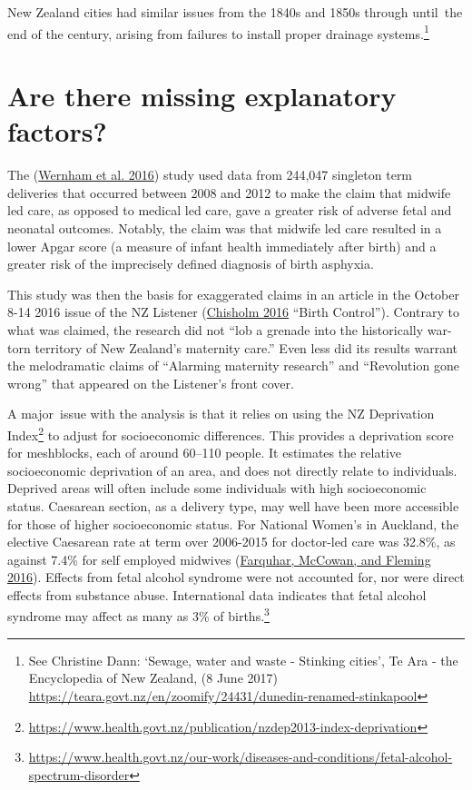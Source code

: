 \documentclass[
  10ptls,
  b5paper]{book}
\begin{document}
New Zealand cities had similar issues from the 1840s and 1850s through until~the end of the century, arising from failures to install proper drainage systems.\footnote{See Christine Dann: `Sewage, water and waste - Stinking cities', Te Ara - the Encyclopedia of New Zealand, (8 June 2017) \url{https://teara.govt.nz/en/zoomify/24431/dunedin-renamed-stinkapool}}

\hypertarget{sec:maternity}{%
\section{Are there missing explanatory factors?}\label{sec:maternity}}

The (\protect\hyperlink{ref-wernham_EtAl_2016}{Wernham et al. 2016}) study used data from 244,047 singleton term deliveries that occurred between 2008 and 2012 to make the claim that midwife led care, as opposed to medical led care, gave a greater risk of adverse fetal and neonatal outcomes. Notably, the claim was that midwife led care resulted in a lower Apgar score (a measure of infant health immediately after birth) and a greater risk of the imprecisely defined diagnosis of birth asphyxia.

This study was then the basis for exaggerated claims in an article in the October 8-14 2016 issue of the NZ Listener (\protect\hyperlink{ref-chisholm_2016}{Chisholm 2016} ``Birth Control''). Contrary to what was claimed, the research did not ``lob a grenade into the historically war-torn territory of New Zealand's maternity care.'' Even less did its results warrant the melodramatic claims of ``Alarming maternity research'' and ``Revolution gone wrong'' that appeared on the Listener's front cover.

A major~issue with the analysis is that it relies on using the NZ Deprivation Index\footnote{\url{https://www.health.govt.nz/publication/nzdep2013-index-deprivation}} to adjust for socioeconomic differences. This provides a deprivation score for meshblocks, each of around 60--110 people. It estimates the relative socioeconomic deprivation of an area, and does not directly relate to individuals. Deprived areas will often include some individuals with high socioeconomic status. Caesarean section, as a delivery type, may well have been more accessible for those of higher socioeconomic status. For National Women's in Auckland, the elective Caesarean rate at term over 2006-2015 for doctor-led care was 32.8\%, as against 7.4\% for self employed midwives (\protect\hyperlink{ref-farquhar2016letter}{Farquhar, McCowan, and Fleming 2016}). Effects from fetal alcohol syndrome were not accounted for, nor were direct effects from substance abuse. International data indicates that fetal alcohol syndrome may affect as many as 3\% of births.\footnote{\url{https://www.health.govt.nz/our-work/diseases-and-conditions/fetal-alcohol-spectrum-disorder}}
\end{document}
